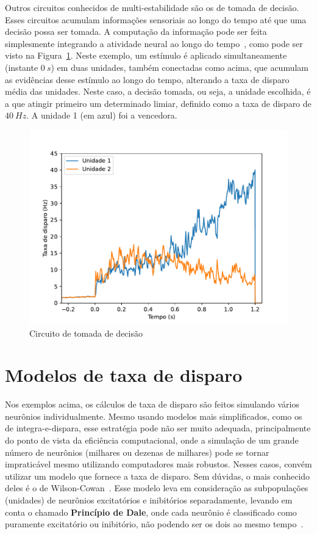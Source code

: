 Outros circuitos conhecidos de multi-estabilidade são os de tomada de decisão. Esses circuitos acumulam informações sensoriais ao longo do tempo até que uma decisão possa ser tomada. A computação da informação pode ser feita simplesmente integrando a atividade neural ao longo do tempo~\cite{cain_computational_2012}, como pode ser visto na Figura~\ref{fig:tomadadecisao}. Neste exemplo, um estímulo é aplicado simultaneamente (instante $0\ s$) em duas unidades, também conectadas como acima, que acumulam as evidências desse estímulo ao longo do tempo, alterando a taxa de disparo média das unidades. Neste caso, a decisão tomada, ou seja, a unidade escolhida, é a que atingir primeiro um determinado limiar, definido como a taxa de disparo de $40\ Hz$. A unidade 1 (em azul) foi a vencedora.
\begin{figure}[tb]
	\centering
	\caption[Circuito de tomada de decisão]{Circuito de tomada de decisão}
	\label{fig:tomadadecisao}
	\includegraphics[width=0.7\linewidth]{figs/tomada_decisao}
\end{figure}

\section{Modelos de taxa de disparo}\label{sec:modelostaxa}
Nos exemplos acima, os cálculos de taxa de disparo são feitos simulando vários neurônios individualmente. Mesmo usando modelos mais simplificados, como os de integra-e-dispara, esse estratégia pode não ser muito adequada, principalmente do ponto de vista da eficiência computacional, onde a simulação de um grande número de neurônios (milhares ou dezenas de milhares) pode se tornar impraticável mesmo utilizando computadores mais robustos. Nesses casos, convém utilizar um modelo que fornece a taxa de disparo. Sem dúvidas, o mais conhecido deles é o de Wilson-Cowan~\cite{wilson_excitatory_1972}. Esse modelo leva em consideração as subpopulações (unidades) de neurônios excitatórios e inibitórios separadamente, levando em conta o chamado \textbf{Princípio de Dale}, onde cada neurônio é classificado como puramente excitatório ou inibitório, não podendo ser os dois ao mesmo tempo~\cite{dale_pharmacology_1935}.

